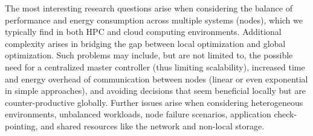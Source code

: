 The most interesting research questions arise when considering the balance of performance and energy consumption across multiple systems (nodes), which we typically find in both HPC and cloud computing environments.
Additional complexity arises in bridging the gap between local optimization and global optimization.
Such problems may include, but are not limited to, the possible need for a centralized master controller (thus limiting scalability), increased time and energy overhead of communication between nodes (linear or even exponential in simple approaches), and avoiding decisions that seem beneficial locally but are counter-productive globally.
Further issues arise when considering heterogeneous environments, unbalanced workloads, node failure scenarios, application check-pointing, and shared resources like the network and non-local storage.
